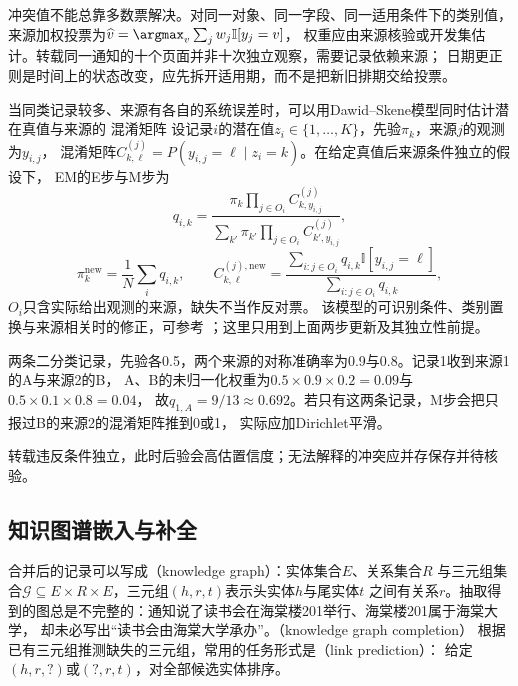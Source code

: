 冲突值不能总靠多数票解决。对同一对象、同一字段、同一适用条件下的类别值，
来源加权投票为$\widehat{v}=\argmax_v\sum_jw_j\mathbb{I}[y_j=v]$，
权重应由来源核验或开发集估计。转载同一通知的十个页面并非十次独立观察，需要记录依赖来源；
日期更正则是时间上的状态改变，应先拆开适用期，而不是把新旧排期交给投票。

当同类记录较多、来源有各自的系统误差时，可以用Dawid--Skene模型同时估计潜在真值与来源的
混淆矩阵
设记录$i$的潜在值$z_i\in\{1,\ldots,K\}$，先验$\pi_k$，来源$j$的观测为$y_{i,j}$，
混淆矩阵$C^{(j)}_{k,\ell}=P(y_{i,j}=\ell\mid z_i=k)$。在给定真值后来源条件独立的假设下，
EM的E步与M步为
\begin{equation}
  q_{i,k}=
  \frac{\pi_k\prod_{j\in O_i}C^{(j)}_{k,y_{i,j}}}
       {\sum_{k'}\pi_{k'}\prod_{j\in O_i}C^{(j)}_{k',y_{i,j}}},
  \label{eq:nlp-extraction-ds-e}
\end{equation}
\begin{equation}
  \pi_k^{\mathrm{new}}=\frac{1}{N}\sum_iq_{i,k},
  \qquad
  C^{(j),\mathrm{new}}_{k,\ell}=
  \frac{\sum_{i:j\in O_i}q_{i,k}\mathbb{I}[y_{i,j}=\ell]}
       {\sum_{i:j\in O_i}q_{i,k}},
  \label{eq:nlp-extraction-ds-m}
\end{equation}
$O_i$只含实际给出观测的来源，缺失不当作反对票。
该模型的可识别条件、类别置换与来源相关时的修正，可参考
；这里只用到上面两步更新及其独立性前提。

\begin{example}[一次来源后验]
\label{ex:nlp-extraction-ds}
两条二分类记录，先验各0.5，两个来源的对称准确率为0.9与0.8。记录1收到来源1的A与来源2的B，
A、B的未归一化权重为$0.5\times0.9\times0.2=0.09$与$0.5\times0.1\times0.8=0.04$，
故$q_{1,A}=9/13\approx0.692$。若只有这两条记录，M步会把只报过B的来源2的混淆矩阵推到0或1，
实际应加Dirichlet平滑。
\end{example}

转载违反条件独立，此时后验会高估置信度；无法解释的冲突应并存保存并待核验。

\subsection{知识图谱嵌入与补全}
\label{sec:nlp-extraction-kge}

合并后的记录可以写成（knowledge graph）：实体集合$E$、关系集合$R$
与三元组集合$\mathcal{G}\subseteq E\times R\times E$，三元组$(h,r,t)$表示头实体$h$与尾实体$t$
之间有关系$r$。抽取得到的图总是不完整的：通知说了读书会在海棠楼201举行、海棠楼201属于海棠大学，
却未必写出“读书会由海棠大学承办”。（knowledge graph completion）
根据已有三元组推测缺失的三元组，常用的任务形式是（link prediction）：
给定$(h,r,?)$或$(?,r,t)$，对全部候选实体排序。

